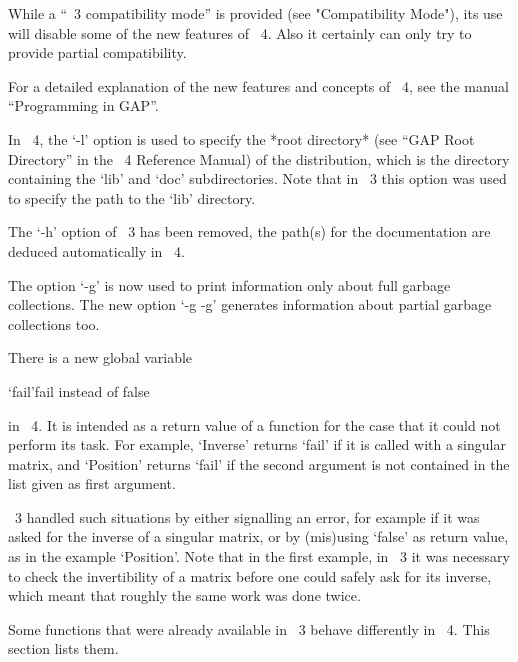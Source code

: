 While a ``{\GAP}~3 compatibility mode'' is provided
(see "Compatibility Mode"),
its use will disable some of the new features of {\GAP}~4.
Also it certainly can only try to provide partial compatibility.

For a detailed explanation of the new features and concepts of {\GAP}~4,
see the manual ``Programming in GAP''.



In {\GAP}~4, the `-l' option is used to specify the *root directory*
(see ``GAP Root Directory'' in the {\GAP}~4 Reference Manual)
of the {\GAP} distribution,
which is the directory containing the `lib' and `doc' subdirectories.
Note that in {\GAP}~3 this option was used to specify the path to the
`lib' directory.

The `-h' option of {\GAP}~3 has been removed,
the path(s) for the documentation are deduced automatically in {\GAP}~4.

The option `-g' is now used to print information only about full garbage
collections.
The new option `-g -g' generates  information about partial
garbage collections too.



There is a new global variable

\>`fail'{fail instead of false}

in {\GAP}~4.
It is intended as a return value of a function for the case that it
could not perform its task.
For example, `Inverse' returns `fail' if it is called with a singular
matrix, and `Position' returns `fail' if the second argument is not
contained in the list given as first argument.

{\GAP}~3 handled such situations by either signalling an error,
for example if it was asked for the inverse of a singular matrix,
or by (mis)using `false' as return value, as in the example `Position'.
Note that in the first example, in {\GAP}~3 it was necessary to check
the invertibility of a matrix before one could safely ask for its
inverse, which meant that roughly the same work was done twice.



Some functions that were already available in {\GAP}~3  behave
differently in {\GAP}~4.  This section lists them.

